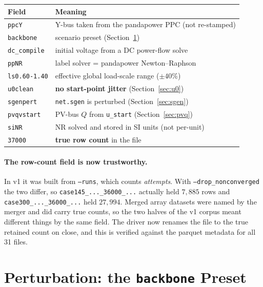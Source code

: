 \documentclass{article}
\begin{document}
\begin{center}
\begin{tabular}{ll}
\toprule
\textbf{Field} & \textbf{Meaning} \\
\midrule
\texttt{ppcY}            & Y-bus taken from the pandapower PPC (not re-stamped) \\
\texttt{backbone}        & scenario preset (Section~\ref{sec:pert}) \\
\texttt{dc\_compile}     & initial voltage from a DC power-flow solve \\
\texttt{ppNR}            & label solver = pandapower Newton--Raphson \\
\texttt{ls0.60-1.40}     & effective global load-scale range ($\pm40\%$) \\
\texttt{u0clean}         & \textbf{no start-point jitter} (Section~\ref{sec:u0}) \\
\texttt{sgenpert}        & \texttt{net.sgen} is perturbed (Section~\ref{sec:sgen}) \\
\texttt{pvqvstart}       & PV-bus $Q$ from \texttt{u\_start} (Section~\ref{sec:pvq}) \\
\texttt{siNR}            & NR solved and stored in SI units (not per-unit) \\
\texttt{37000}           & \textbf{true row count} in the file \\
\bottomrule
\end{tabular}
\end{center}

\paragraph{The row-count field is now trustworthy.}
In v1 it was built from \texttt{--runs}, which counts \emph{attempts}.  With
\texttt{--drop\_nonconverged} the two differ, so
\texttt{case145\_...\_36000\_...} actually held $7{,}885$ rows and
\texttt{case300\_...\_36000\_...} held $27{,}994$.  Merged array datasets were
named by the merger and did carry true counts, so the two halves of the v1
corpus meant different things by the same field.  The driver now renames the
file to the true retained count on close, and this is verified against the
parquet metadata for all 31 files.


\section{Perturbation: the \texttt{backbone} Preset}
\label{sec:pert}
\end{document}
